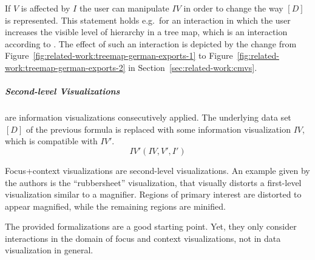 If $V$ is affected by $I$ the user can manipulate $IV$ in order to change the way $[D]$ is represented.
This statement holds e.g.\ for an interaction in which the user increases the visible level of hierarchy in a tree map, which is an  interaction according to \textcite{Yi2007}.
The effect of such an interaction is depicted by the change from Figure~\ref{fig:related-work:treemap-german-exports-1} to Figure~\ref{fig:related-work:treemap-german-exports-2} in Section~\ref{sec:related-work:cmvs}.

\subparagraph{Second-level Visualizations} are information visualizations consecutively applied.
The underlying data set $[D]$ of the previous formula is replaced with some information visualization $IV$, which is compatible with $IV'$.
\begin{equation}
  IV'(IV, V', I')
\end{equation}

Focus+context visualizations are second-level visualizations.
An example given by the authors is the  ``rubbersheet'' visualization, that visually distorts a first-level visualization similar to a magnifier.
Regions of primary interest are distorted to appear magnified, while the remaining regions are minified.

The provided formalizations are a good starting point.
Yet, they only consider interactions in the domain of focus and context visualizations, not in data visualization in general.


